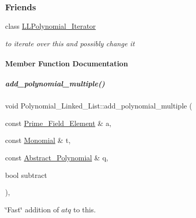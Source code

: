 \subsubsection*{Friends}
\begin{DoxyCompactItemize}
\item 
\mbox{\label{group__polygroup_adc04ceaa684cbc36bd6800c57364bd2e}} 
class \hyperlink{group__polygroup_adc04ceaa684cbc36bd6800c57364bd2e}{L\+L\+Polynomial\+\_\+\+Iterator}
\begin{DoxyCompactList}\small\item\em to iterate over {\ttfamily this} and possibly change it \end{DoxyCompactList}\end{DoxyCompactItemize}


\paragraph{Member Function Documentation}
\mbox{\label{group__polygroup_a610a577011774265552efb30508ece94}} 
\subparagraph{\texorpdfstring{add\+\_\+polynomial\+\_\+multiple()}{add\_polynomial\_multiple()}}
{\footnotesize\ttfamily void Polynomial\+\_\+\+Linked\+\_\+\+List\+::add\+\_\+polynomial\+\_\+multiple (\begin{DoxyParamCaption}\item[{const \hyperlink{group___fields_group_class_prime___field___element}{Prime\+\_\+\+Field\+\_\+\+Element} \&}]{a,  }\item[{const \hyperlink{group__polygroup_class_monomial}{Monomial} \&}]{t,  }\item[{const \hyperlink{group__polygroup_class_abstract___polynomial}{Abstract\+\_\+\+Polynomial} \&}]{q,  }\item[{bool}]{subtract }\end{DoxyParamCaption})\hspace{0.3cm}{\ttfamily [override]}, {\ttfamily [virtual]}}



\char`\"{}\+Fast\char`\"{} addition of $atq$ to {\ttfamily this}. 

